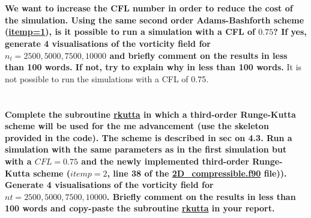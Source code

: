 \documentclass[10pt, a4paper]{article}
\begin{document}
\section{}
\textbf{We want to increase the CFL number in order to reduce the cost of the simulation. Using the same second order Adams-Bashforth scheme (\url{itemp=1}), is it possible to run a simulation with a CFL of $0.75$? If yes, generate 4 visualisations of the vorticity field for $n_t = 2500, 5000, 7500, 10000$ and briefly comment on the results in less than 100 words. If not, try to explain why in less than 100 words.}
\newline
\noindent
It is not possible to run the simulations with a CFL of 0.75.

\section{}
\textbf{Complete the subroutine \url{rkutta} in which a third-order Runge-Kutta scheme will be used for the me advancement (use the skeleton provided in the code). The scheme is described in sec on 4.3. Run a simulation with the same parameters as in the first simulation but with a $CFL=0.75$ and the newly implemented third-order Runge-Kutta scheme ($itemp=2$, line 38 of the \url{2D_compressible.f90} file)). Generate 4 visualisations of the vorticity field for $nt = 2500, 5000, 7500, 10000$. Briefly comment on the results in less than 100 words and copy-paste the subroutine \url{rkutta} in your report.}
\end{document}
